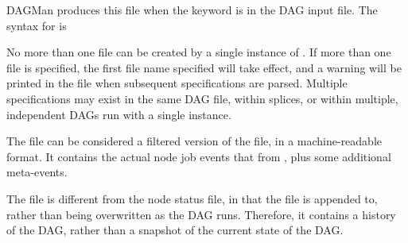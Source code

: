 DAGMan produces this file when the keyword  is
in the DAG input file.
The syntax for  is

 

No more than one  file can be created by a single
instance of .
If more than one  file is specified,
the first file name specified will take effect,
and a warning will be printed in the  file
when subsequent  specifications are parsed.
Multiple specifications may exist in the same DAG file, within splices,
or within multiple, independent DAGs run with a single  instance.

The  file can be considered a filtered
version of the  file, in a machine-readable format.
It contains the actual node job events that from ,
plus some additional meta-events.

The  file is different from the node status file,
in that the  file is appended to,
rather than being overwritten as the DAG runs.
Therefore, it contains a history of the DAG,
rather than a snapshot of the current state of the DAG.

